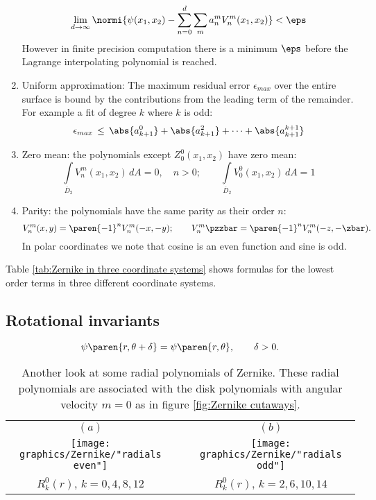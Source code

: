 \begin{enumerate}
$$ \lim_{d\to\infty} \normi{\psi(x_1,x_2) - \sum_{n=0}^{d}{\sum_{m}{a_n^m V_n^m(x_1,x_2)}}} < \eps $$
However in finite precision computation there is a minimum $\eps$ before the Lagrange interpolating polynomial is reached.
%
\item Uniform approximation: The maximum residual error $\epsilon_{max}$ over the entire surface is bound by the contributions from the leading term of the remainder. For example a fit of degree $k$ where $k$ is odd:
$$\epsilon_{max} \, \le \, \abs{a_{k+1}^{0}} + \abs{a_{k+1}^{2}} + \dots + \abs{a_{k+1}^{k+1}}$$
%
\item Zero mean: the polynomials except $Z_0^0(x_1,x_2)$ have zero mean:
$$ \int\limits_{\overline{D}_2}{V_n^m(x_1,x_2)\,dA} = 0, \quad n>0; \qquad \int\limits_{\overline{D}_2}{V_0^0(x_1,x_2)\,dA} = 1$$
%
\item Parity: the polynomials have the same parity as their order $n$:
\begin{equation*}
  V_{n}^{m} (x,y) = \paren{-1}^{n}V_{n}^{m} (-x,-y); \qquad V_{n}^{m} \pzzbar = \paren{-1}^{n} V_{n}^{m} (-z,-\zbar).
\end{equation*}
In polar coordinates we note that cosine is an even function and sine is odd.
%
\end{enumerate}

Table \eqref{tab:Zernike in three coordinate systems} shows formulas for the lowest order terms in three different coordinate systems.



\subsection{Rotational invariants}
\begin{equation}
  \psi \paren{r,\theta + \delta} = \psi \paren{r,\theta}, \qquad \delta > 0.
\end{equation}

\begin{table}[htbp]
\caption[Another look at some radial polynomials of Zernike]{Another look at some radial polynomials of Zernike. These radial polynomials are associated with the disk polynomials with angular velocity $m=0$ as in figure \eqref{fig:Zernike cutaways}.}
\begin{center}
\begin{tabular}{ccc}
$(a)$ & \phantom{m} & $(b)$ \\[10pt]
\texttt{[image: graphics/Zernike/"radials even"]} &&
\texttt{[image: graphics/Zernike/"radials odd"]} \\
$R_{k}^{0}(r)$, $k=0,4,8,12$ &&
$R_{k}^{0}(r)$, $k=2,6,10,14$
\end{tabular}
\end{center}
\label{fig:Zernike radials}
\end{table}%


